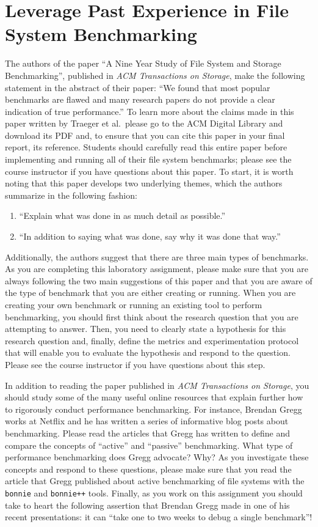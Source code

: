 \section*{Leverage Past Experience in File System Benchmarking}

The authors of the paper ``A Nine Year Study of File System and Storage Benchmarking'', published in {\em ACM
Transactions on Storage}, make the following statement in the abstract of their paper: ``We found that most popular
benchmarks are flawed and many research papers do not provide a clear indication of true performance.'' To learn more
about the claims made in this paper written by Traeger et al.\ please go to the ACM Digital Library and download its PDF
and, to ensure that you can cite this paper in your final report, its  reference. Students should
carefully read this entire paper before implementing and running all of their file system benchmarks; please see the
course instructor if you have questions about this paper. To start, it is worth noting that this paper develops two
underlying themes, which the authors summarize in the following fashion:

\begin{enumerate}
  \itemsep 0in
  \item ``Explain what was done in as much detail as possible.''
  \item ``In addition to saying what was done, say why it was done that way.''
\end{enumerate}

Additionally, the authors suggest that there are three main types of benchmarks. As you are completing this laboratory
assignment, please make sure that you are always following the two main suggestions of this paper and that you are aware
of the type of benchmark that you are either creating or running. When you are creating your own benchmark or running an
existing tool to perform benchmarking, you should first think about the research question that you are attempting to
answer. Then, you need to clearly state a hypothesis for this research question and, finally, define the
metrics and experimentation protocol that will enable you to evaluate the hypothesis and respond to the question. Please
see the course instructor if you have questions about this step.

In addition to reading the paper published in {\em ACM Transactions on Storage}, you should study some of the many
useful online resources that explain further how to rigorously conduct performance benchmarking. For instance, Brendan
Gregg works at Netflix and he has written a series of informative blog posts about benchmarking. Please read the
articles that Gregg has written to define and compare the concepts of ``active'' and ``passive'' benchmarking. What type
of performance benchmarking does Gregg advocate? Why? As you investigate these concepts and respond to these questions,
please make sure that you read the article that Gregg published about active benchmarking of file systems with the {\tt
  bonnie} and {\tt bonnie++} tools. Finally, as you work on this assignment you should take to heart the following
  assertion that Brendan Gregg made in one of his recent presentations: it can ``take one to two weeks to debug a single
  benchmark''!

